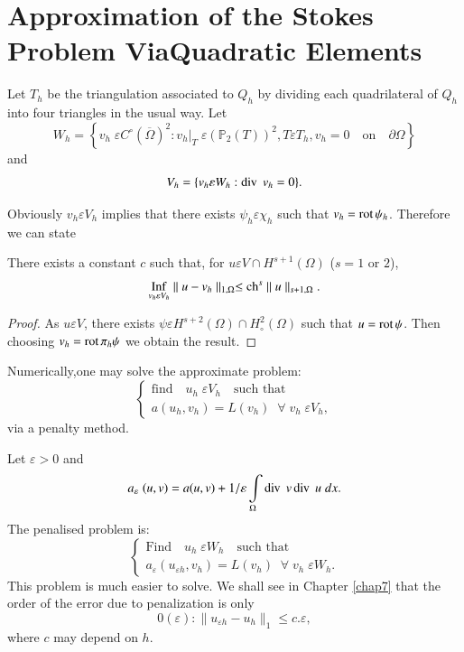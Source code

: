 \section[Approximation of the Stokes Problem...]{Approximation of the
  Stokes Problem Via\hfil\break Quadratic 
  Elements}\label{chap6:ssec6.4}

Let $T_h$ be the triangulation associated to $Q_h$ by dividing each
quadrilateral of $Q_h$ into four triangles in the usual way. Let 
$$
W_h=\left\{v_h\;\varepsilon C^\circ(\overline{\Omega})^2:v_h|_T\;
\varepsilon(\mathbb{P}_2(T))^2,T\varepsilon T_h,v_h=0\quad\text{on}
\quad\partial\Omega\right\}  
$$
and 
$$
V_h=\{v_h\varepsilon W_h:\operatorname{div}\; v_h=0\}.
$$

Obviously $v_h\varepsilon V_h$ implies that there exists $\psi_h
\varepsilon \chi_h$ such that $v_h=\operatorname{rot}\psi_h$. Therefore we can state

\begin{THM}\label{chap6:THM3}
There exists a constant $c$ such that, for $u\varepsilon V\cap
H^{s+1}(\Omega)$ ($s=1$ or $2$),
$$
\underset{v_h\varepsilon V_h}{\operatorname{Inf}}\parallel u-v_h\parallel_{1,\Omega}
\leq\operatorname{ch}^s\parallel u\parallel_{s+1,\Omega}.
$$
\end{THM}

\begin{proof}
As $u\varepsilon V$, there exists $\psi\varepsilon H^{s+2}(\Omega)\cap
H_\circ^2(\Omega)$ such that $u=\operatorname{rot}\psi$. Then choosing $v_h=\operatorname{rot}
\pi_h\psi$ we obtain the result. 
\end{proof}

Numerically,\pageoriginale one may solve the approximate problem:
\begin{equation*}
\begin{cases}
\text{find}\quad u_h\;\varepsilon V_h\quad\text{such that}\\
a(u_h, v_h)=L(v_h)\; \; \forall\;v_h\;\varepsilon V_h,
\end{cases}
\end{equation*}
via a penalty method.

Let $\varepsilon >0$ and
$$
a_\varepsilon\;(u, v)=a(u, v)+1/\varepsilon \int\limits_\Omega \operatorname{div}\;
v \operatorname{div}\; u\; dx.
$$
The penalised problem is:
\begin{equation*}
\begin{cases}
\text{Find}\quad u_h\;\varepsilon W_h\quad\text{such that}\\
a_\varepsilon(u_{\varepsilon h},v_h)=L(v_h)\; \; \forall \;v_h\;
\varepsilon W_h.
\end{cases}
\end{equation*}
This problem is much easier to solve. We shall see in Chapter
\ref{chap7} that the order of the error due to penalization is only 
$$
0(\varepsilon):\parallel u_{\varepsilon h}-u_h\parallel_1\leq
c.\varepsilon,
$$
where $c$ may depend on $h$.

